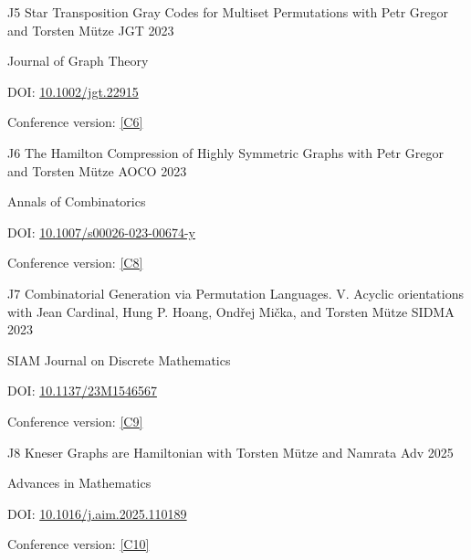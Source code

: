 \begin{cvpublication}
	{J5}
	{Star Transposition Gray Codes for Multiset Permutations}
	{with Petr Gregor and Torsten Mütze}
	{JGT}
	{2023}
    {
	\begin{cvitems}
	\item Journal of Graph Theory
	\item[] DOI: \href{https://doi.org/10.1002/jgt.22915}{10.1002/jgt.22915}
	\item Conference version: \hyperlink{paperC6}{[C6]}
	\end{cvitems}
	}
\end{cvpublication}
\begin{cvpublication}
	{J6}
	{The Hamilton Compression of Highly Symmetric Graphs}
	{with Petr Gregor and Torsten Mütze}
	{AOCO}
	{2023}
    {
	\begin{cvitems}
	\item Annals of Combinatorics
	\item[] DOI: \href{https://doi.org/10.1007/s00026-023-00674-y}{10.1007/s00026-023-00674-y}
	\item Conference version: \hyperlink{paperC8}{[C8]}
	\end{cvitems}
	}
\end{cvpublication}
\begin{cvpublication}
	{J7}
	{Combinatorial Generation via Permutation Languages. V. Acyclic orientations}
	{with Jean Cardinal, Hung P. Hoang, Ondřej Mička, and Torsten Mütze}
	{SIDMA}
	{2023}
    {
	\begin{cvitems}
	\item SIAM Journal on Discrete Mathematics
	\item[] DOI: \href{https://doi.org/10.1137/23M1546567}{10.1137/23M1546567}
	\item Conference version: \hyperlink{paperC9}{[C9]}
	\end{cvitems}
	}
\end{cvpublication}
\begin{cvpublication}
	{J8}
	{Kneser Graphs are Hamiltonian}
	{with Torsten Mütze and Namrata}
	{Adv}
	{2025}
    {
	\begin{cvitems}
	\item Advances in Mathematics
	\item[] DOI: \href{https://doi.org/10.1016/j.aim.2025.110189}{10.1016/j.aim.2025.110189}
	\item Conference version: \hyperlink{paperC10}{[C10]}
	\end{cvitems}
	}
\end{cvpublication}
